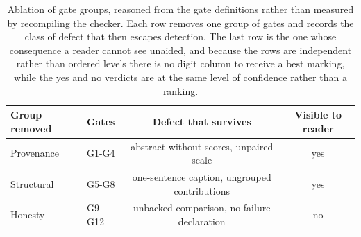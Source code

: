 \begin{table}[t]
\centering
\caption{Ablation of gate groups, reasoned from the gate definitions rather than measured by recompiling the checker. Each row removes one group of gates and records the class of defect that then escapes detection. The last row is the one whose consequence a reader cannot see unaided, and because the rows are independent rather than ordered levels there is no digit column to receive a best marking, while the yes and no verdicts are at the same level of confidence rather than a ranking.}
\label{tab:ablation}
\begin{tabular}{llcc}
\toprule
\textbf{Group removed} & \textbf{Gates} & \textbf{Defect that survives} & \textbf{Visible to reader} \\
\midrule
Provenance & G1-G4 & abstract without scores, unpaired scale & yes \\
Structural & G5-G8 & one-sentence caption, ungrouped contributions & yes \\
Honesty & G9-G12 & unbacked comparison, no failure declaration & no \\
\bottomrule
\end{tabular}
\par\vspace{2pt}{\footnotesize 'Visible to reader' means detectable without running the checker, by reading the draft once.}
\end{table}
